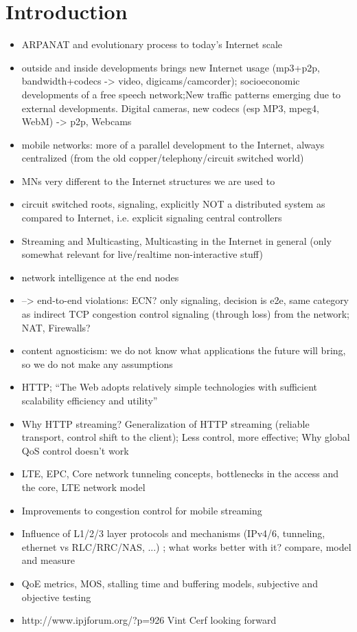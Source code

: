 \chapter{Introduction}
\label{chap:intro}


\begin{itemize}

\item ARPANAT and evolutionary process to today's Internet scale
\item outside and inside developments brings new Internet usage (mp3+p2p, bandwidth+codecs -> video, digicams/camcorder); socioeconomic developments of a free speech network;New traffic patterns emerging due to external developments. Digital cameras, new codecs (esp MP3, mpeg4, WebM) -> p2p, Webcams 
\item mobile networks: more of a parallel development to the Internet, always centralized (from the old copper/telephony/circuit switched world)
\item MNs very different to the Internet structures we are used to
\item circuit switched roots, signaling, explicitly NOT a distributed system as compared to Internet, i.e. explicit signaling central controllers
\item Streaming and Multicasting, Multicasting in the Internet in general (only somewhat relevant for live/realtime non-interactive stuff)
\item  network intelligence at the end nodes
\item --> end-to-end violations: ECN? only signaling, decision is e2e, same category as indirect TCP congestion control signaling (through loss) from the network; NAT, Firewalls?
\item content agnosticism: we do not know what applications the future will bring, so we do not make any assumptions
\item HTTP; ``The Web adopts relatively simple technologies with sufficient scalability efficiency and utility'' \cite{W3Arch}
\item Why HTTP streaming? Generalization of HTTP streaming (reliable transport, control shift to the client); Less control, more effective; Why global \gls{QoS} control doesn't work
\item \gls{LTE}, \gls{EPC}, Core network tunneling concepts, bottlenecks in the access and the core, \gls{LTE} network model
\item Improvements to congestion control for mobile streaming
\item Influence of L1/2/3 layer protocols and mechanisms (IPv4/6, tunneling, ethernet vs RLC/RRC/NAS, ...) ; what works better with it? compare, model and measure
\item \gls{QoE} metrics, \gls{MOS}, stalling time and buffering models, subjective and objective testing
\item http://www.ipjforum.org/?p=926 Vint Cerf looking forward


\end{itemize}
